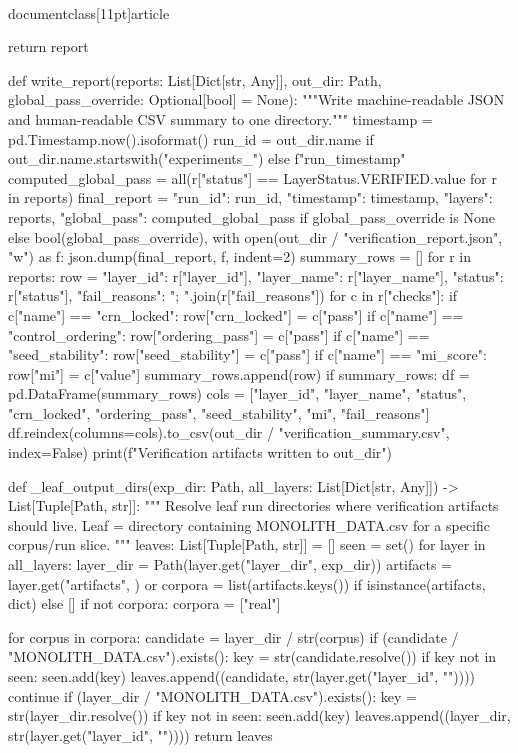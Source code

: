 \\documentclass[11pt]{article}
\begin{document}
\begin{CodeBlock}
    return report

def write_report(reports: List[Dict[str, Any]], out_dir: Path, global_pass_override: Optional[bool] = None):
    """Write machine-readable JSON and human-readable CSV summary to one directory."""
    timestamp = pd.Timestamp.now().isoformat()
    run_id = out_dir.name if out_dir.name.startswith("experiments_") else f"run_{timestamp}"
    computed_global_pass = all(r["status"] == LayerStatus.VERIFIED.value for r in reports)
    final_report = {
        "run_id": run_id,
        "timestamp": timestamp,
        "layers": reports,
        "global_pass": computed_global_pass if global_pass_override is None else bool(global_pass_override),
    }
    with open(out_dir / "verification_report.json", "w") as f: json.dump(final_report, f, indent=2)
    summary_rows = []
    for r in reports:
        row = {"layer_id": r["layer_id"], "layer_name": r["layer_name"], "status": r["status"], "fail_reasons": "; ".join(r["fail_reasons"])}
        for c in r["checks"]:
            if c["name"] == "crn_locked": row["crn_locked"] = c["pass"]
            if c["name"] == "control_ordering": row["ordering_pass"] = c["pass"]
            if c["name"] == "seed_stability": row["seed_stability"] = c["pass"]
            if c["name"] == "mi_score": row["mi"] = c["value"]
        summary_rows.append(row)
    if summary_rows:
        df = pd.DataFrame(summary_rows)
        cols = ["layer_id", "layer_name", "status", "crn_locked", "ordering_pass", "seed_stability", "mi", "fail_reasons"]
        df.reindex(columns=cols).to_csv(out_dir / "verification_summary.csv", index=False)
    print(f"Verification artifacts written to {out_dir}")


def _leaf_output_dirs(exp_dir: Path, all_layers: List[Dict[str, Any]]) -> List[Tuple[Path, str]]:
    """
    Resolve leaf run directories where verification artifacts should live.
    Leaf = directory containing MONOLITH_DATA.csv for a specific corpus/run slice.
    """
    leaves: List[Tuple[Path, str]] = []
    seen = set()
    for layer in all_layers:
        layer_dir = Path(layer.get("layer_dir", exp_dir))
        artifacts = layer.get("artifacts", {}) or {}
        corpora = list(artifacts.keys()) if isinstance(artifacts, dict) else []
        if not corpora:
            corpora = ["real"]

        for corpus in corpora:
            candidate = layer_dir / str(corpus)
            if (candidate / "MONOLITH_DATA.csv").exists():
                key = str(candidate.resolve())
                if key not in seen:
                    seen.add(key)
                    leaves.append((candidate, str(layer.get("layer_id", ""))))
                continue
            if (layer_dir / "MONOLITH_DATA.csv").exists():
                key = str(layer_dir.resolve())
                if key not in seen:
                    seen.add(key)
                    leaves.append((layer_dir, str(layer.get("layer_id", ""))))
    return leaves



\end{CodeBlock}
\end{document}
